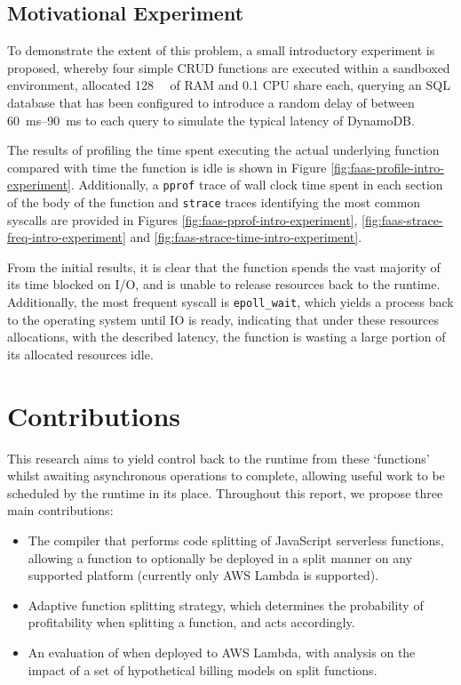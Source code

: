 \subsection{Motivational Experiment}
To demonstrate the extent of this problem, a small introductory experiment is proposed, whereby four simple CRUD \faas{} functions are executed within a sandboxed environment, allocated \SI{128}{\mega\byte} of RAM and 0.1 CPU share each, querying an SQL database that has been configured to introduce a random delay of between \qtyrange{60}{90}{\ms} to each query to simulate the typical latency of DynamoDB.

The results of profiling the time spent executing the actual underlying function compared with time the function is idle is shown in Figure \ref{fig:faas-profile-intro-experiment}. Additionally, a \verb|pprof| trace of wall clock time spent in each section of the body of the function and \verb|strace| traces identifying the most common syscalls are provided in Figures \ref{fig:faas-pprof-intro-experiment},
\ref{fig:faas-strace-freq-intro-experiment} and \ref{fig:faas-strace-time-intro-experiment}.

From the initial results, it is clear that the function spends the vast majority of its time blocked on I/O, and is unable to release resources back to the runtime. Additionally, the most frequent syscall is \verb|epoll_wait|, which yields a process back to the operating system until IO is ready, indicating that under these resources allocations, with the described latency, the function is wasting a large portion of its allocated resources idle.

\section{Contributions}

This research aims to yield control back to the runtime from these `functions' whilst awaiting asynchronous operations to complete, allowing useful work to be scheduled by the runtime in its place. Throughout this report, we propose three main contributions:

\begin{itemize}
    \item The \faaasc{} compiler that performs code splitting of JavaScript serverless functions, allowing a function to optionally be deployed in a split manner on any supported \faas{} platform (currently only AWS Lambda is supported).

    \item Adaptive function splitting strategy, which determines the probability of profitability when splitting a function, and acts accordingly.

    \item An evaluation of \faaas{} when deployed to AWS Lambda, with analysis on the impact of a set of hypothetical billing models on split functions.
\end{itemize}

